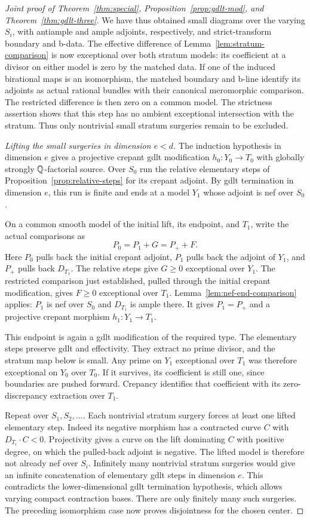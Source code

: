 \begin{proof}[Joint proof of Theorem~\ref{thm:special},
Proposition~\ref{prop:gdlt-mod}, and Theorem~\ref{thm:gdlt-three}]
We have thus obtained small diagrams over the varying
$S_i$, with antiample and ample adjoints, respectively,
and strict-transform boundary and b-data.  The effective
difference of Lemma~\ref{lem:stratum-comparison} is now
exceptional over both stratum models: its coefficient
at a divisor on either model is zero by the matched data.
If one of the induced birational maps is an isomorphism,
the matched boundary and b-line identify its adjoints
as actual rational bundles with their canonical
meromorphic comparison.  The restricted difference is
then zero on a common model.  The strictness assertion
shows that this step has no ambient exceptional
intersection with the stratum.  Thus only nontrivial
small stratum surgeries remain to be excluded.

\smallskip
\noindent\emph{Lifting the small surgeries in dimension $e<d$.}
The induction hypothesis in dimension $e$ gives a
projective crepant gdlt modification
$h_0:Y_0\to T_0$ with globally strongly
$\mathbb Q$-factorial source.  Over $S_0$ run the relative
elementary steps of Proposition~\ref{prop:relative-steps}
for its crepant adjoint.  By gdlt termination in
dimension $e$, this run is finite and ends at a model
$Y_1$ whose adjoint is nef over $S_0$.

On a common smooth model of the initial lift, its
endpoint, and $T_1$, write the actual comparisons as
\[
 P_0=P_1+G=P_++F.
\]
Here $P_0$ pulls back the initial crepant adjoint,
$P_1$ pulls back the adjoint of $Y_1$, and $P_+$ pulls
back $D_{T_1}$.  The relative steps give $G\geq0$
exceptional over $Y_1$.  The restricted comparison
just established, pulled through the initial crepant
modification, gives $F\geq0$ exceptional over $T_1$.
Lemma~\ref{lem:nef-end-comparison} applies: $P_1$ is
nef over $S_0$ and $D_{T_1}$ is ample there.  It gives
$P_1=P_+$ and a projective crepant morphism
$h_1:Y_1\to T_1$.

This endpoint is again a gdlt modification of the
required type.  The elementary steps preserve gdlt
and effectivity.  They extract no prime divisor, and
the stratum map below is small.  Any prime on $Y_1$
exceptional over $T_1$ was therefore exceptional on
$Y_0$ over $T_0$.  If it survives, its coefficient is
still one, since boundaries are pushed forward.
Crepancy identifies that coefficient with its
zero-discrepancy extraction over $T_1$.

Repeat over $S_1,S_2,\ldots$.  Each nontrivial stratum
surgery forces at least one lifted elementary step.
Indeed its negative morphism has a contracted curve
$C$ with $D_{T_i}\cdot C<0$.  Projectivity gives a
curve on the lift dominating $C$ with positive
degree, on which the pulled-back adjoint is negative.
The lifted model is therefore not already nef over
$S_i$.  Infinitely many nontrivial stratum surgeries
would give an infinite concatenation of elementary
gdlt steps in dimension $e$.  This contradicts the
lower-dimensional gdlt termination hypothesis, which
allows varying compact contraction bases.  There
are only finitely many such surgeries.  The preceding
isomorphism case now proves disjointness for the
chosen center.


\end{proof}
